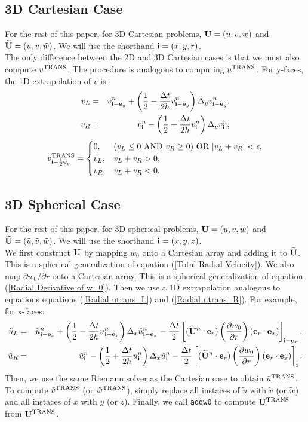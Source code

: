 \documentclass[11pt]{article}
\def\half  {\frac{1}{2}}
\def\dt    {\Delta t}
\def\trans {\rm TRANS}
\def\eb    {{\bf e}}
\def\ib    {{\bf i}}
\def\Ub    {{\bf U}}
\def\Ubt   {\widetilde{\bf U}}
\def\ut    {\tilde{u}}
\def\vt    {\tilde{v}}
\def\wt    {\tilde{w}}
\begin{document}
\subsection{3D Cartesian Case}
For the rest of this paper, for 3D Cartesian problems, $\Ub = (u,v,w)$ and $\Ubt = (u,v,\wt)$.  We will use the shorthand $\ib = (x,y,r)$.\\

The only difference between the 2D and 3D Cartesian cases is that we must also compute $v^{\trans}$.  The procedure is analogous to computing $u^{\trans}$.  For y-faces, the 1D extrapolation of $v$ is:
\begin{eqnarray}
v_L &=& v_{\ib-\eb_y}^n + \left(\half - \frac{\dt}{2h}v_{\ib-\eb_y}^n\right)\Delta_y v_{\ib-\eb_y}^n, \\
v_R &=& v_{\ib}^n - \left(\half + \frac{\dt}{2h}v_{\ib}^n\right)\Delta_y v_{\ib}^n,
\end{eqnarray}
\begin{equation}
v^{\trans}_{\ib-\half\eb_y} =
\begin{cases}
0, & (v_L \le 0 ~ {\rm AND} ~ v_R \ge 0) ~ {\rm OR} ~ |v_L + v_R| < \epsilon, \\
v_L, & v_L + v_R > 0, \\
v_R, & v_L + v_R < 0. \\
\end{cases}
\end{equation}
\subsection{3D Spherical Case}
For the rest of this paper, for 3D spherical problems, $\Ub = (u,v,w)$ and $\Ubt = (\ut,\vt,\wt)$.  We will use the shorthand $\ib = (x,y,z)$.\\

We first construct $\Ub$ by mapping $w_0$ onto a Cartesian array and adding it to $\Ubt$.  This is a spherical generalization of equation (\ref{Total Radial Velocity}).  We also map $\partial w_0/\partial r$ onto a Cartesian array.  This is a spherical generalization of equation (\ref{Radial Derivative of w_0}).  Then we use a 1D extrapolation analogous to equations equations (\ref{Radial utrans_L}) and (\ref{Radial utrans_R}).  For example, for x-faces:
\begin{eqnarray}
\ut_L &=& \ut_{\ib-\eb_x}^n + \left(\half - \frac{\dt}{2h}u_{\ib-\eb_x}^n\right)\Delta_x\ut_{\ib-\eb_x}^n - \frac{\dt}{2}\left[(\Ubt^n\cdot\eb_r)\left(\frac{\partial w_0}{\partial r}\right)(\eb_r\cdot\eb_x)\right]_{\ib-\eb_x}, \\
\ut_R &=& \ut_{\ib}^n - \left(\half + \frac{\dt}{2h}u_{\ib}^n\right)\Delta_x\ut_{\ib}^n - \frac{\dt}{2}\left[(\Ubt^n\cdot\eb_r)\left(\frac{\partial w_0}{\partial r}\right)(\eb_r\cdot\eb_x)\right]_{\ib}.
\end{eqnarray}
Then, we use the same Riemann solver as the Cartesian case to obtain $\ut^{\trans}$.  To compute $\vt^{\trans}$ (or $\wt^{\trans}$), simply replace all instaces of $\ut$ with $\vt$ (or $\wt$) and all instaces of $x$ with $y$ (or $z$).  Finally, we call {\tt addw0} to compute $\Ub^{\trans}$ from $\Ubt^{\trans}$.
\cleardoublepage
\end{document}
